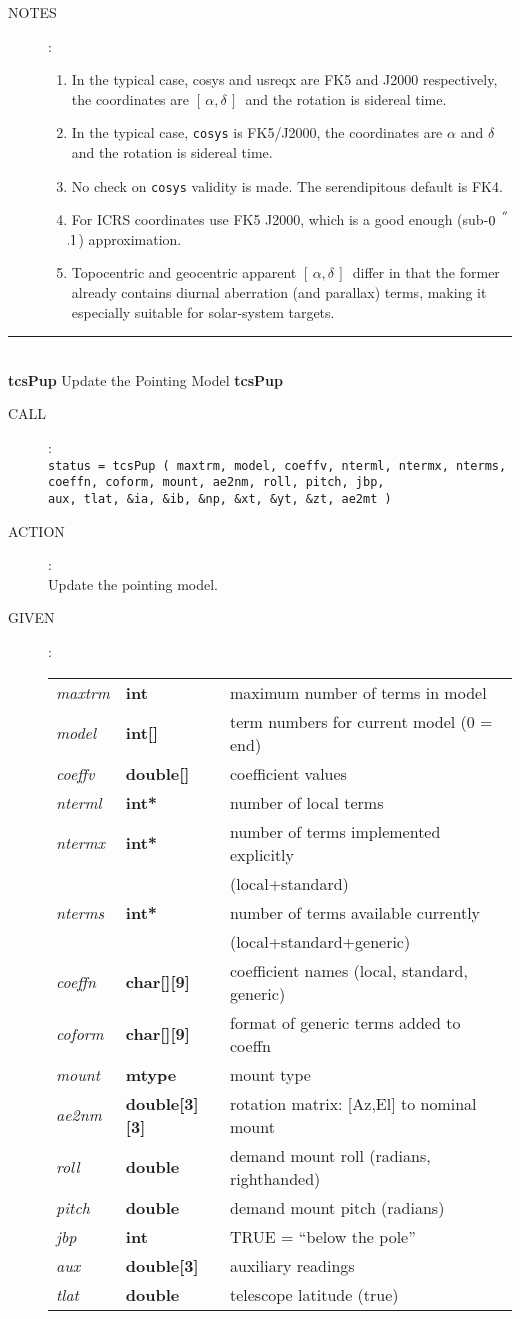 \documentclass[12pt,fleqn,twoside]{article}
\renewcommand{\_}{{\tt\char'137}}     %
\newcommand{\radec}     {$[\,\alpha,\delta\,]$}
\newcommand{\arcsec}[2] {\arcseci{#1}$\hspace{-0.4em}.#2$}
\newcommand{\arcseci}[1] {$#1\hspace{0.05em}$\raisebox{-0.5ex}
                         {$^{'\hspace{-0.1em}'}$}}
\newcommand{\routine}[2]
{
  \newpage
  \rule{\textwidth}{0.3mm}\\ \nopagebreak
  {\Large {\bf #1} \hfill #2 \hfill {\bf #1}}
  \vspace{-1ex}
}
\newcommand{\call}[1]
{
  \goodbreak
  \begin{description}
    \item[CALL]: \\[0.5ex] \nopagebreak
        {\tt #1}
  \end{description}
  \vspace{-3ex}
}
\newcommand{\action}[1]
{
  \goodbreak
  \begin{description}
    \item[ACTION]: \\[0.5ex] \nopagebreak
        #1
  \end{description}
  \vspace{-3ex}
}
\newcommand{\args}[2]
{
  \goodbreak
  \begin{description}
  \item[#1]: \\[1.5ex] \nopagebreak
    \hspace*{-0.9em}
    \begin{tabular}{p{4.5em}p{5.8em}p{23.5em}}
      #2
    \end{tabular}
  \end{description}
  \vspace{-3ex}
}
\newcommand{\spec}[3]
{
  {\em {#1}} & {\bf \mbox{#2}} & {#3}
}
\newcommand{\notes}[1]
{
  \goodbreak
  \begin{description}
    \item[NOTES]: \nopagebreak
        #1
  \end{description}
  \vspace{-3ex}
}
\begin{document}
\notes{
\begin{enumerate}
\setlength{\parskip}{\medskipamount}
\item In the typical case, cosys and usreqx are FK5 and J2000
      respectively, the coordinates are \radec\ and the rotation is
      sidereal time.
\item In the typical case, {\tt cosys} is FK5/J2000,
      the coordinates are $\alpha$ and $\delta$
      and the rotation is sidereal time.
\item No check on {\tt cosys} validity is made.  The serendipitous default
      is FK4.
\item For ICRS coordinates use FK5 J2000, which is a good enough
      (sub-\arcsec{0}{1}) approximation.
\item Topocentric and geocentric apparent \radec\ differ in that the
      former already contains diurnal aberration (and parallax) terms,
      making it especially suitable for solar-system targets.
\end{enumerate}
}
\routine{tcsPup}{Update the Pointing Model}
\label{tcsPup}
\call{status = tcsPup ( maxtrm, model, coeffv, nterml, ntermx, nterms, \\
        \hspace*{8.5em} coeffn, coform, mount,
                        ae2nm, roll, pitch, jbp, \\
        \hspace*{8.5em} aux, tlat,
                        \&ia, \&ib, \&np, \&xt, \&yt, \&zt, ae2mt ) }
\action{Update the pointing model.}
\args{GIVEN}
{
\spec{maxtrm}{int}{maximum number of terms in model} \\
\spec{model}{int[]}{term numbers for current model (0 = end)} \\
\spec{coeffv}{double[]}{coefficient values} \\
\spec{nterml}{int*}{number of local terms} \\
\spec{ntermx}{int*}{number of terms implemented explicitly} \\
\spec{}{}{\hfill (local+standard)} \\
\spec{nterms}{int*}{number of terms available currently} \\
\spec{}{}{\hfill (local+standard+generic)} \\
\spec{coeffn}{char[][9]}{coefficient names (local, standard, generic)} \\
\spec{coform}{char[][9]}{format of generic terms added to coeffn} \\
\spec{mount}{{\sc mtype}}{mount type} \\
\spec{ae2nm}{double[3][3]}{rotation matrix: [Az,El] to nominal mount} \\
\spec{roll}{double}{demand mount roll (radians, righthanded)} \\
\spec{pitch}{double}{demand mount pitch (radians)} \\
\spec{jbp}{int}{TRUE = ``below the pole''} \\
\spec{aux}{double[3]}{auxiliary readings} \\
\spec{tlat}{double}{telescope latitude (true)}
}
\end{document}
